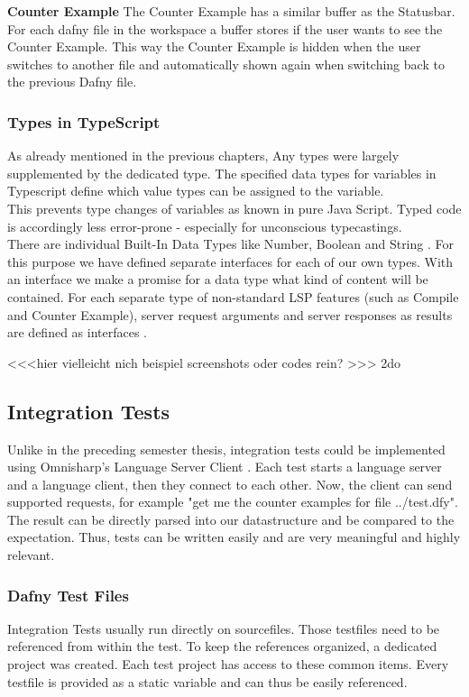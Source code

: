 {\bf Counter Example} \textendash{}
The Counter Example has a similar buffer as the Statusbar.
For each dafny file in the workspace a buffer stores if the user wants to see the Counter Example.
This way the Counter Example is hidden when the user switches to another file
and automatically shown again when switching back to the previous Dafny file.

\subsubsection{Types in TypeScript}
As already mentioned in the previous chapters, Any types were largely supplemented by the dedicated type.
The specified data types for variables in Typescript define which value types can be assigned to the variable. \\

This prevents type changes of variables as known in pure Java Script.
Typed code is accordingly less error-prone - especially for unconscious typecastings. \\

There are individual Built-In Data Types like Number, Boolean and String \cite{ts-types}.
For this purpose we have defined separate interfaces for each of our own types.
With an interface we make a promise for a data type what kind of content will be contained.
For each separate type of non-standard LSP features (such as Compile and Counter Example),
server request arguments and server responses as results are defined as interfaces \cite{ts-interface}.

<<<hier vielleicht nich beispiel screenshots oder codes rein? >>> 2do

\subsection{Integration Tests}
Unlike in the preceding semester thesis, integration tests could be implemented using Omnisharp's Language Server Client \cite{omnisharpClient}. Each test starts a language server and a language client, then they connect to each other. Now, the client can send supported requests, for example "get me the counter examples for file ../test.dfy". The result can be directly parsed into our  datastructure and be compared to the expectation. Thus, tests can be written easily and are very meaningful and highly relevant.

\subsubsection{Dafny Test Files}
Integration Tests usually run directly on  sourcefiles. Those testfiles need to be referenced from within the test. To keep the references organized, a dedicated project  was created. Each test project has access to these common items. Every testfile is provided as a static variable and can thus be easily referenced.

